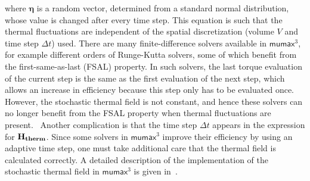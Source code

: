 \documentclass[11pt,a4paper,english]{article}
\renewcommand{\vec}[1]{\boldsymbol{#1}}
\newcommand{\mumax}{$\mathsf{mumax}^3$}
\begin{document}
where $\vec{\eta}$ is a random vector, determined from a standard normal distribution, whose value is changed after every time step. This equation is such that the thermal fluctuations are independent of the spatial discretization (volume $V$ and time step $\Delta t$) used.
There are many finite-difference solvers available in \mumax{}, for example different orders of Runge-Kutta solvers, some of which benefit from the first-same-as-last (FSAL) property. In such solvers, the last torque evaluation of the current step is the same as the first evaluation of the next step, which allows an increase in efficiency because this step only has to be evaluated once. However, the stochastic thermal field is not constant, and hence these solvers can no longer benefit from the FSAL property when thermal fluctuations are present.~\cite{LEL-17b} Another complication is that the time step $\Delta t$ appears in the expression for $\vb{H_{therm}}$. Since some solvers in \mumax{} improve their efficiency by using an adaptive time step, one must take additional care that the thermal field is calculated correctly. A detailed description of the implementation of the stochastic thermal field in \mumax{} is given in~\cite{LEL-17b}.

\clearpage
\end{document}

